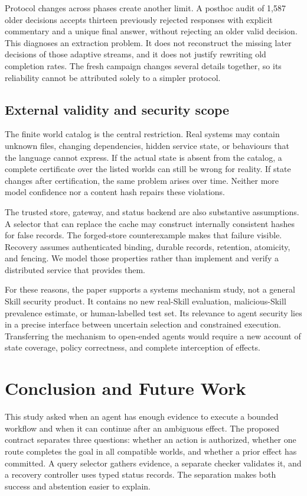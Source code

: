 \documentclass[conference]{IEEEtran}
\begin{document}
Protocol changes across phases create another limit. A posthoc audit of 1,587 older decisions accepts thirteen previously rejected responses with explicit commentary and a unique final answer, without rejecting an older valid decision. This diagnoses an extraction problem. It does not reconstruct the missing later decisions of those adaptive streams, and it does not justify rewriting old completion rates. The fresh campaign changes several details together, so its reliability cannot be attributed solely to a simpler protocol.

\subsection{External validity and security scope}
The finite world catalog is the central restriction. Real systems may contain unknown files, changing dependencies, hidden service state, or behaviours that the language cannot express. If the actual state is absent from the catalog, a complete certificate over the listed worlds can still be wrong for reality. If state changes after certification, the same problem arises over time. Neither more model confidence nor a content hash repairs these violations.

The trusted store, gateway, and status backend are also substantive assumptions. A selector that can replace the cache may construct internally consistent hashes for false records. The forged-store counterexample makes that failure visible. Recovery assumes authenticated binding, durable records, retention, atomicity, and fencing. We model those properties rather than implement and verify a distributed service that provides them.

For these reasons, the paper supports a systems mechanism study, not a general Skill security product. It contains no new real-Skill evaluation, malicious-Skill prevalence estimate, or human-labelled test set. Its relevance to agent security lies in a precise interface between uncertain selection and constrained execution. Transferring the mechanism to open-ended agents would require a new account of state coverage, policy correctness, and complete interception of effects.

\section{Conclusion and Future Work}
\label{sec:conclusion}
This study asked when an agent has enough evidence to execute a bounded workflow and when it can continue after an ambiguous effect. The proposed contract separates three questions: whether an action is authorized, whether one route completes the goal in all compatible worlds, and whether a prior effect has committed. A query selector gathers evidence, a separate checker validates it, and a recovery controller uses typed status records. The separation makes both success and abstention easier to explain.
\end{document}
